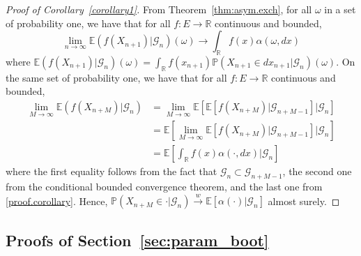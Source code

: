 \documentclass{article}
\theoremstyle{definition}
\newcommand{\red}[1]{\textcolor{red}{#1}}
\renewcommand{\&}{and}
\begin{document}
\begin{proof}[Proof of Corollary~\ref{corollary1}]
From Theorem~\ref{thm:asym.exch}, for all $\omega$ in a set of probability one, we have that for all $f:E\to\mathbb{R}$ continuous and bounded,
\begin{equation}\label{proof.corollary}
   \lim_{n\to\infty} \mathbb{E}(f(X_{n+1})|\mathcal{G}_{n})(\omega) \to \int_{\mathbb{R}}f(x) \alpha(\omega,dx)
\end{equation}
where   $\mathbb{E}(f(X_{n+1})|\mathcal{G}_{n})(\omega) = \int_{\mathbb{R}}f(x_{n+1})\mathbb{P}(X_{n+1}\in dx_{n+1} |\mathcal{G}_{n})(\omega)$. On the same set of probability one, we have that for all $f:E\to\mathbb{R}$ continuous and bounded,
\begin{align*}
    \lim_{M\to \infty} \mathbb{E}\left(f(X_{n+M})  |\mathcal{G}_{n}\right) & = \lim_{M\to \infty} \mathbb{E}\left[ \mathbb{E}\left[ f(X_{n+M}) | \mathcal{G}_{n+M-1}\right] \bigg| \mathcal{G}_{n}\right]  \\
    & = \mathbb{E}\left[ \lim_{M\to \infty}\mathbb{E}\left[ f(X_{n+M}) | \mathcal{G}_{n+M-1}\right] \bigg| \mathcal{G}_{n}\right] \\
    &= \mathbb{E}\left[ \int_{\mathbb{R}}f(x) \alpha(\cdot,dx) \bigg| \mathcal{G}_{n}\right] 
\end{align*}  
where the first equality follows from the fact that $\mathcal{G}_{n}\subset\mathcal{G}_{n+M-1}$, the second one from the conditional bounded convergence theorem, and the last one from \eqref{proof.corollary}. Hence, 
 $\mathbb{P}\left(X_{n+M}\in \cdot  |\mathcal{G}_{n}\right) \stackrel{w}{\to} \mathbb{E}[ \alpha(\cdot)|\mathcal{G}_{n}]$ almost surely.
\end{proof}\vspace{0.4cm}





\subsection{Proofs of Section~\ref{sec:param_boot}}\label{sec:proof_param_boot}
\end{document}
